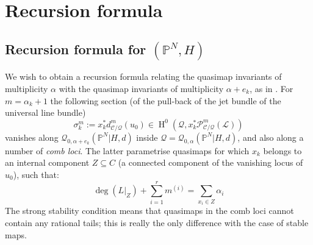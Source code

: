 \documentclass[10pt]{amsart}
\newcommand{\Q}[4]{\mathcal{Q}_{#1,#2}(#3,#4)}
\newcommand{\PP}{\mathbb P}
\newcommand{\HH}{\operatorname{H}}
\newcommand{\om}[1]{\mathcal{#1}}
\theoremstyle{definition}
\theoremstyle{definition}
\newcommand{\ilemph}[1]{\emph{#1}}
\begin{document}
\section{Recursion formula}\label{section recursion}\label{section recursion formula}
\subsection{Recursion formula for $(\PP^N,H)$} \label{Section recursion for PN}
\label{Subsection recursion formula for PN}
We wish to obtain a recursion formula relating the quasimap invariants of multiplicity $\alpha$ with the quasimap invariants of multiplicity $\alpha + e_k$, as in \cite[Theorem 2.6]{Ga}. For $m = \alpha_k + 1$ the following section (of the pull-back of the jet bundle of the universal line bundle)
\[
\sigma^m_k := x_k^*d^m_{\mathcal C/\om{Q}}(u_0)\in \HH^0(\om{Q},x_k^*\mathcal P^m_{\mathcal C/\mathcal Q}(\mathcal L))
\]
vanishes along $\Q{0}{\alpha+e_k}{\PP^N|H}{d}$ inside $\om{Q} = \Q{0}{\alpha}{\PP^N|H}{d}$, and also along a number of \ilemph{comb loci}.  The latter parametrise quasimaps for which $x_k$ belongs to an internal component $Z \subseteq C$ (a connected component of the vanishing locus of $u_0$), such that:
\begin{equation*}\deg(L|_{Z})+\sum_{i=1}^r m^{(i)}=\sum_{x_i\in Z}\alpha_i \end{equation*}
The strong stability condition means that quasimaps in the comb loci cannot contain any rational tails; this is really the only difference with the case of stable maps.
\end{document}
